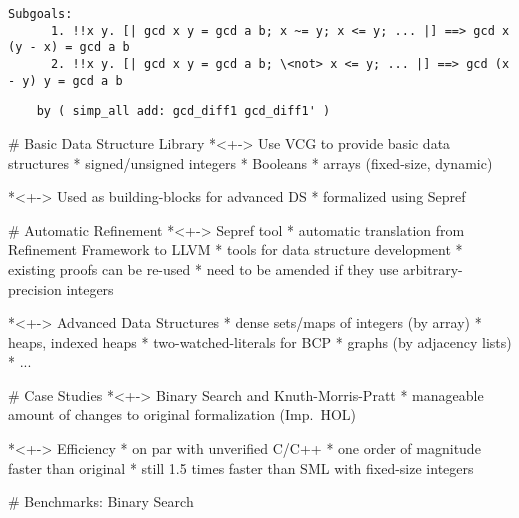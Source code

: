 \documentclass[fleqn]{beamer}
\begin{document}
  {\everymath{\color{darkgray}}
  \begin{lstlisting}[basicstyle=\color{darkgray}]
    Subgoals:
      1. !!x y. [| gcd x y = gcd a b; x ~= y; x <= y; ... |] ==> gcd x (y - x) = gcd a b
      2. !!x y. [| gcd x y = gcd a b; \<not> x <= y; ... |] ==> gcd (x - y) y = gcd a b
  \end{lstlisting}
  }
  \pause

  \begin{lstlisting}
    by ( simp_all add: gcd_diff1 gcd_diff1' )
  \end{lstlisting}

# Basic Data Structure Library
  *<+-> Use VCG to provide basic data structures
    * signed/unsigned integers
    * Booleans
    * arrays (fixed-size, dynamic)

  *<+-> Used as building-blocks for advanced DS
    * formalized using Sepref

\renewcommand{\insertsectitle}{\color{red}{Frontend}}

# Automatic Refinement
  *<+-> Sepref tool
    * automatic translation from Refinement Framework to LLVM
    * tools for data structure development
    * existing proofs can be re-used
      * need to be amended if they use arbitrary-precision integers

  *<+-> Advanced Data Structures
    * dense sets/maps of integers (by array)
    * heaps, indexed heaps
    * two-watched-literals for BCP
    * graphs (by adjacency lists)
    * ...

%

# Case Studies
  *<+-> Binary Search and Knuth-Morris-Pratt
    * manageable amount of changes to original formalization (Imp.~HOL)

  *<+-> Efficiency
    * on par with unverified C/C++
    * one order of magnitude faster than original
    * still 1.5 times faster than SML with fixed-size integers

\renewcommand{\insertsectitle}{}

# Benchmarks: Binary Search
\end{document}
